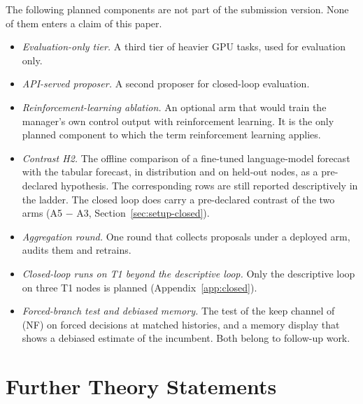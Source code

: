 The following planned components are not part of the submission version. None of them enters a claim of this paper.
\begin{itemize}
\item \emph{Evaluation-only tier.} A third tier of heavier GPU tasks, used for evaluation only.
\item \emph{API-served proposer.} A second proposer for closed-loop evaluation.
\item \emph{Reinforcement-learning ablation.} An optional arm that would train the manager's own control output with reinforcement learning. It is the only planned component to which the term reinforcement learning applies.
\item \emph{Contrast H2.} The offline comparison of a fine-tuned language-model forecast with the tabular forecast, in distribution and on held-out nodes, as a pre-declared hypothesis. The corresponding rows are still reported descriptively in the ladder. The closed loop does carry a pre-declared contrast of the two arms (A5 $-$ A3, Section~\ref{sec:setup-closed}).
\item \emph{Aggregation round.} One round that collects proposals under a deployed arm, audits them and retrains.
\item \emph{Closed-loop runs on T1 beyond the descriptive loop.} Only the descriptive loop on three T1 nodes is planned (Appendix~\ref{app:closed}). 
\item \emph{Forced-branch test and debiased memory.} The test of the keep channel of (NF) on forced decisions at matched histories, and a memory display that shows a debiased estimate of the incumbent. Both belong to follow-up work.
\end{itemize}

\section{Further Theory Statements}
\label{app:theory}

